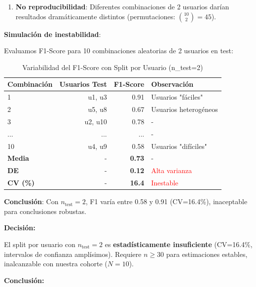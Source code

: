 \documentclass[12pt,letterpaper,twoside]{report}
\begin{document}
\begin{calculobox}
\begin{estadisticobox}
\begin{enumerate}[noitemsep]
    \item \textbf{No reproducibilidad}: Diferentes combinaciones de 2 usuarios darían resultados dramáticamente distintos (permutaciones: $\binom{10}{2}=45$).
\end{enumerate}
\end{estadisticobox}

\begin{calculobox}
\textbf{Simulación de inestabilidad}:

Evaluamos F1-Score para 10 combinaciones aleatorias de 2 usuarios en test:

\begin{table}[H]
\centering
\caption{Variabilidad del F1-Score con Split por Usuario (n\_test=2)}
\label{tab:split_instability}
\begin{tabular}{@{}lrrl@{}}
\toprule
\textbf{Combinación} & \textbf{Usuarios Test} & \textbf{F1-Score} & \textbf{Observación} \\
\midrule
1 & u1, u3  & 0.91 & Usuarios "fáciles" \\
2 & u5, u8  & 0.67 & Usuarios heterogéneos \\
3 & u2, u10 & 0.78 & - \\
... & ... & ... & - \\
10 & u4, u9  & 0.58 & Usuarios "difíciles" \\
\midrule
\textbf{Media} & - & \textbf{0.73} & - \\
\textbf{DE} & - & \textbf{0.12} & \textcolor{red}{Alta varianza} \\
\textbf{CV (\%)} & - & \textbf{16.4} & \textcolor{red}{Inestable} \\
\bottomrule
\end{tabular}
\end{table}

\textbf{Conclusión}: Con $n_{\text{test}}=2$, F1 varía entre 0.58 y 0.91 (CV=16.4\%), inaceptable para conclusiones robustas.
\end{calculobox}

\begin{decisionbox}
\textbf{Decisión:}

El split por usuario con $n_{\text{test}}=2$ es \textbf{estadísticamente insuficiente} (CV=16.4\%, intervalos de confianza amplísimos). Requiere $n \geq 30$ para estimaciones estables, inalcanzable con nuestra cohorte ($N=10$).
\end{decisionbox}

\begin{conclusionbox}
\textbf{Conclusión:}


\end{conclusionbox}
\end{calculobox}
\end{document}
